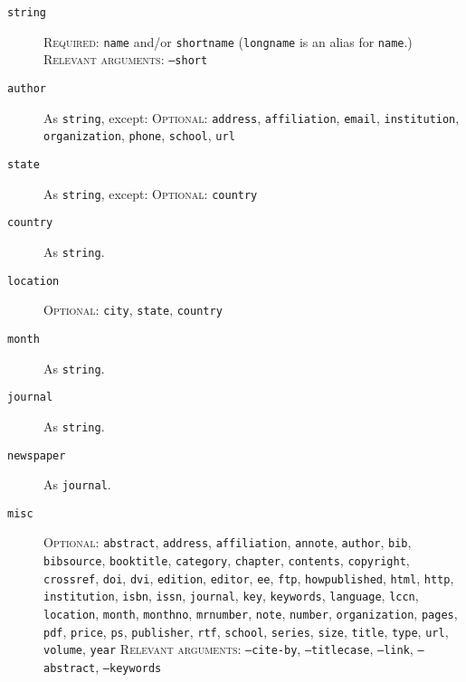 \documentclass{article}
\begin{document}
\begin{description}

\item[\texttt{string}]
\textsc{Required:} \texttt{name} and/or \texttt{shortname} (\texttt{longname} is an alias for \texttt{name}.)
\textsc{Relevant arguments:} \texttt{--short}

\item[\texttt{author}] As \texttt{string}, except:
\textsc{Optional:} \texttt{address}, \texttt{affiliation}, \texttt{email}, \texttt{institution}, \texttt{organization}, \texttt{phone}, \texttt{school}, \texttt{url}

\item[\texttt{state}] As \texttt{string}, except:
\textsc{Optional:} \texttt{country}

\item[\texttt{country}] As \texttt{string}.

\item[\texttt{location}]
\textsc{Optional:} \texttt{city}, \texttt{state}, \texttt{country}

\item[\texttt{month}] As \texttt{string}.

\item[\texttt{journal}] As \texttt{string}.

\item[\texttt{newspaper}] As \texttt{journal}.

\item[\texttt{misc}]
\textsc{Optional:}
\texttt{abstract},
\texttt{address},
\texttt{affiliation},
\texttt{annote},
\texttt{author},
\texttt{bib},
\texttt{bibsource},
\texttt{booktitle},
\texttt{category},
\texttt{chapter},
\texttt{contents},
\texttt{copyright},
\texttt{crossref},
\texttt{doi},
\texttt{dvi},
\texttt{edition},
\texttt{editor},
\texttt{ee},
\texttt{ftp},
\texttt{howpublished},
\texttt{html},
\texttt{http},
\texttt{institution},
\texttt{isbn},
\texttt{issn},
\texttt{journal},
\texttt{key},
\texttt{keywords},
\texttt{language},
\texttt{lccn},
\texttt{location},
\texttt{month},
\texttt{monthno},
\texttt{mrnumber},
\texttt{note},
\texttt{number},
\texttt{organization},
\texttt{pages},
\texttt{pdf},
\texttt{price},
\texttt{ps},
\texttt{publisher},
\texttt{rtf},
\texttt{school},
\texttt{series},
\texttt{size},
\texttt{title},
\texttt{type},
\texttt{url},
\texttt{volume},
\texttt{year}
\textsc{Relevant arguments:} \texttt{--cite-by}, \texttt{--titlecase}, \texttt{--link}, \texttt{--abstract}, \texttt{--keywords}


\end{description}
\end{document}

